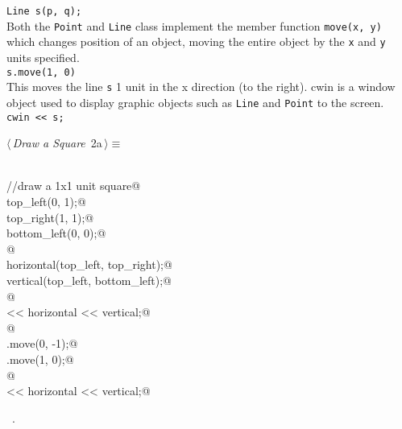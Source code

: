 \documentclass{article}
\begin{document}
\indent \verb|Line s(p, q);|\\
Both the \verb|Point| and \verb|Line| class implement the member function
\verb|move(x, y)| which changes position of an object, moving the entire
object by the \verb|x| and \verb|y| units specified.\\
\indent \verb|s.move(1, 0)|\\
This moves the line \verb|s| 1 unit in the x direction (to the right). cwin
is a window object used to display graphic objects such as \verb|Line| and
\verb|Point| to the screen.\\
\indent \verb|cwin << s;|\\
\begin{flushleft} \small
\begin{minipage}{\linewidth}\label{scrap2}\raggedright\small
{} $\langle\,${\it Draw a Square}\nobreak\ {\footnotesize {2a}}$\,\rangle\equiv$
\vspace{-1ex}
\begin{list}{}{} \item
\mbox{}\verb@@\\
\mbox{}\verb@//draw a 1x1 unit square@\\
\mbox{}\verb@Point top_left(0, 1);@\\
\mbox{}\verb@Point top_right(1, 1);@\\
\mbox{}\verb@Point bottom_left(0, 0);@\\
\mbox{}\verb@        @\\
\mbox{}\verb@Line horizontal(top_left, top_right);@\\
\mbox{}\verb@Line vertical(top_left, bottom_left);@\\
\mbox{}\verb@        @\\
\mbox{}\verb@cwin << horizontal << vertical;@\\
\mbox{}\verb@        @\\
\mbox{}\verb@horizontal.move(0, -1);@\\
\mbox{}\verb@vertical.move(1, 0);@\\
\mbox{}\verb@        @\\
\mbox{}\verb@cwin << horizontal << vertical;@\\
\mbox{}\verb@@{\NWsep}
\end{list}
\vspace{-1.5ex}
\footnotesize
\begin{list}{}{\setlength{\itemsep}{-\parsep}\setlength{\itemindent}{-\leftmargin}}
\item \NWtxtMacroRefIn\ .

\item{}
\end{list}
\end{minipage}\vspace{4ex}
\end{flushleft}
\end{document}
